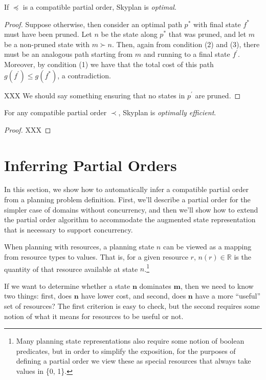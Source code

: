 \documentclass[letterpaper]{article}
\theoremstyle{plain} \newtheorem{theorem}{Theorem} \newtheorem{proposition}{Proposition} \newtheorem{lemma}{Lemma}
\theoremstyle{definition} \newtheorem{definition}{Definition} \newtheorem{conjecture}{Conjecture} \newtheorem*{example}{Example}
\theoremstyle{remark} \newtheorem*{remark}{Remark} \newtheorem*{note}{Note} \newtheorem{case}{Case}
\newcommand{\R}{\mathbb{R}}
\begin{document}
\begin{claim}{}\label{clm-optimal}
   If $\preceq$ is a compatible partial order, Skyplan
is \emph{optimal}.
\end{claim}
\begin{proof} Suppose otherwise, then consider an optimal path $p^*$ with final state $f^*$
  must have been pruned. Let $n$ be the state along $p^*$ that
  was pruned, and let $m$ be a non-pruned state with $m \succ n$.
  Then, again from condition (2) and (3), there must be an analogous path
  starting from $m$ and running to a final state $f^\prime$. Moreover, by condition (1)
  we have that the total cost of this path $g(f^\prime) \le g(f^*)$, a contradiction.

  XXX We should say something ensuring that no states in $p^\prime$ are pruned.
\end{proof}



\begin{claim}{}\label{clm-optimally-efficient}
For any compatible partial order $\prec$, Skyplan is \emph{optimally efficient}.
\end{claim}
\begin{proof} XXX \end{proof}

\section{Inferring Partial Orders}

\newcommand{\po}{\preceq_R}

In this section, we show how to automatically infer a compatible partial order from a
planning problem definition. First, we'll describe a partial order for the simpler case of
domains without concurrency, and then we'll show how to extend the partial order algorithm
to accommodate the augmented state representation that is necessary to support concurrency.

When planning with resources, a planning state $n$ can be viewed as a mapping from resource
types to values. That is, for a given resource $r$, $n(r) \in \R$ is the quantity of that
resource available at state $n$.\footnote{Many planning state representations also require
some notion of boolean predicates, but in order to simplify the exposition, for the
purposes of defining a partial order we view these as special resources that always take
values in \{0, 1\}.}

If we want to determine whether a state $\mathbf{n}$ dominates $\mathbf{m}$, then we need
to know two things: first, does $\mathbf{n}$ have lower cost, and second, does $\mathbf{n}$
have a more ``useful'' set of resources? The first criterion is easy to check, but the
second requires some notion of what it means for resources to be useful or not.
\end{document}
